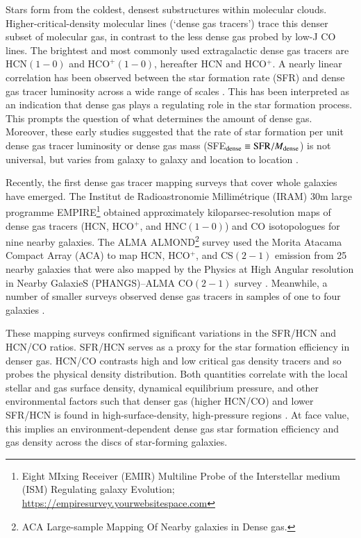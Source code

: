 \documentclass[letter, longauth]{aa} %
\newcommand*{\hcnone}{\ensuremath{\mathrm{HCN(1-0)}}\xspace} %
\newcommand*{\hcopone}{\ensuremath{\text{HCO}^+\mathrm{(1-0)}}\xspace} %
\newcommand*{\hncone}{\ensuremath{\mathrm{HNC(1-0)}}\xspace} %
\newcommand*{\cstwo}{\ensuremath{\mathrm{CS(2-1)}}\xspace} %
\newcommand*{\cotwo}{\ensuremath{\mathrm{CO(2-1)}}\xspace} %
\begin{document}
Stars form from the coldest, densest substructures within molecular clouds. 
Higher-critical-density molecular lines (`dense gas tracers') trace this denser subset of molecular gas, in contrast to the less dense gas probed by low-J CO lines.
The brightest and most commonly used extragalactic dense gas tracers are \hcnone and \hcopone, hereafter HCN and HCO$^+$. A nearly linear correlation has been observed between the star formation rate (SFR) and dense gas tracer luminosity across a wide range of scales \citep[e.g.][]{Gao2004, Wu2010, Garcia-Burillo2012, Usero2015, Chen2017}. This has been interpreted as an indication that dense gas plays a regulating role in the star formation process. This prompts the question of what determines the amount of dense gas. Moreover, these early studies suggested that the rate of star formation per unit dense gas tracer luminosity or dense gas mass (SFE$_{\rm dense} \equiv {\rm SFR}/M_{\rm dense}$) is not universal, but varies from galaxy to galaxy and location to location \citep[][]{Garcia-Burillo2012, Usero2015, Chen2015}.

Recently, the first dense gas tracer mapping surveys that cover whole galaxies have emerged. The Institut de Radioastronomie Millim{\'e}trique (IRAM) 30m large programme EMPIRE\footnote{Eight MIxing Receiver (EMIR) Multiline Probe of the Interstellar medium (ISM) Regulating galaxy Evolution; \url{https://empiresurvey.yourwebsitespace.com}} \citep[][]{Bigiel2016, Jimenez-Donaire2017, Jimenez-Donaire2019} obtained approximately kiloparsec-resolution maps of dense gas tracers (HCN, HCO$^+$, and \hncone) and CO isotopologues for nine nearby galaxies. The ALMA ALMOND\footnote{ACA Large-sample Mapping Of Nearby galaxies in Dense gas.} survey \citep{Neumann2023a} used the Morita Atacama Compact Array (ACA) to map HCN, HCO$^+$, and \cstwo emission from 25 nearby galaxies that were also mapped by the Physics at High Angular resolution in Nearby GalaxieS (PHANGS)--ALMA \cotwo survey \citep{Leroy2021a}. 
Meanwhile, a number of smaller surveys observed dense gas tracers in samples of one to four galaxies \citep[e.g.][]{Tan2018, Gallagher2018a, Gallagher2018b, Querejeta2019, Beslic2021, Heyer2022, Neumann2024, Lin2024}. 

These mapping surveys confirmed significant variations in the SFR/HCN and HCN/CO ratios.
SFR/HCN serves as a proxy for the star formation efficiency in denser gas.
HCN/CO contrasts high and low critical gas density tracers and so probes the physical density distribution. 
Both quantities correlate with the local stellar and gas surface density, dynamical equilibrium pressure, and other environmental factors such that denser gas (higher HCN/CO) and lower SFR/HCN is found in high-surface-density, high-pressure regions \citep[e.g.][]{Jimenez-Donaire2019}.
At face value, this implies an environment-dependent dense gas star formation efficiency and gas density across the discs of star-forming galaxies.
\end{document}
